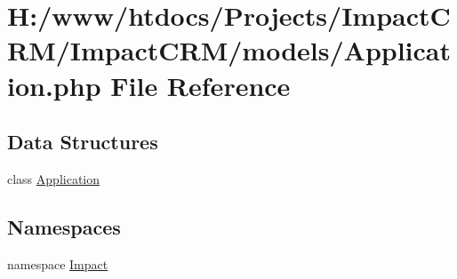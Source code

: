 \hypertarget{Application_8php}{
\section{H:/www/htdocs/Projects/ImpactCRM/ImpactCRM/models/Application.php File Reference}
\label{Application_8php}
}
\subsection*{Data Structures}
\begin{DoxyCompactItemize}
\item 
class \hyperlink{classApplication}{Application}
\end{DoxyCompactItemize}
\subsection*{Namespaces}
\begin{DoxyCompactItemize}
\item 
namespace \hyperlink{namespaceImpact}{Impact}
\end{DoxyCompactItemize}
